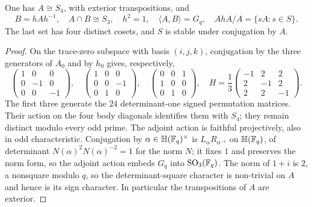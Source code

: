 \begin{lemma}
\label{lem:octahedral-construction}
One has $A\cong S_4$, with exterior transpositions, and
\[
 B=hAh^{-1},\quad A\cap B\cong S_3,\quad h^2=1,\quad
 \langle A,B\rangle=G_q,\quad AhA/A=\{sA:s\in S\}.
\]
The last set has four distinct cosets, and $S$ is stable under conjugation
by $A$.
\end{lemma}
\begin{proof}
On the trace-zero subspace with basis $(i,j,k)$, conjugation by the three
generators of $A_0$ and by $h_0$ gives, respectively,
\[
 \begin{pmatrix}1&0&0\\0&-1&0\\0&0&-1\end{pmatrix},\quad
 \begin{pmatrix}1&0&0\\0&0&-1\\0&1&0\end{pmatrix},\quad
 \begin{pmatrix}0&0&1\\1&0&0\\0&1&0\end{pmatrix},\quad
 H=\frac13\begin{pmatrix}-1&2&2\\2&-1&2\\2&2&-1\end{pmatrix}.
\]
The first three generate the $24$ determinant-one signed permutation
matrices. Their action on the four body diagonals identifies them with
$S_4$; they remain distinct modulo every odd prime. The adjoint action
is faithful projectively, also in odd characteristic. Conjugation by
$\alpha\in\mathbb H(\mathbb{F}_q)^\times$ is $L_\alpha R_{\alpha^{-1}}$ on
$\mathbb H(\mathbb{F}_q)$, of determinant $N(\alpha)^2N(\alpha)^{-2}=1$ for the
norm $N$; it fixes $1$ and preserves the norm form, so the adjoint action
embeds $G_q$ into $\mathrm{SO}_3(\mathbb{F}_q)$. The norm of $1+i$
is $2$, a nonsquare modulo $q$, so the determinant-square character is
non-trivial on $A$ and hence is its sign character. In particular the
transpositions of $A$ are exterior.


\end{proof}
